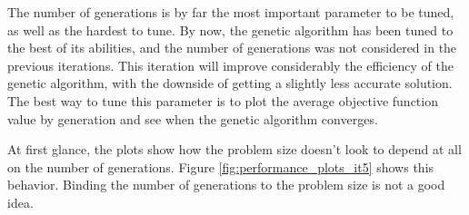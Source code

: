 The number of generations is by far the most important parameter to be tuned, as well as the hardest to tune. By now, the genetic algorithm has been tuned to the best of its abilities, and the number of generations was not considered in the previous iterations. This iteration will improve considerably the efficiency of the genetic algorithm, with the downside of getting a slightly less accurate solution.
The best way to tune this parameter is to plot the average objective function value by generation and see when the genetic algorithm converges.

At first glance, the plots show how the problem size doesn't look to depend at all on the number of generations. Figure \ref{fig:performance_plots_it5} shows this behavior. Binding the number of generations to the problem size is not a good idea.

